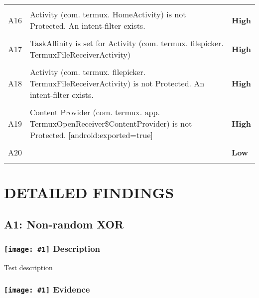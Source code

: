 \documentclass[12p]{article}
\newcommand{\icon}[1]{\texttt{[image: \#1]}}
\begin{document}
\begin{longtable}{p{0.5cm} p{10cm} p{1.5cm}}
\hline\\	A16&Activity \newline (com. termux. HomeActivity) is not Protected. An intent-filter exists.& \color{ferrarired}\textbf{High} \\
\hline\\	A17&TaskAffinity is set for Activity \newline (com. termux. filepicker. TermuxFileReceiverActivity)& \color{ferrarired}\textbf{High} \\
\hline\\	A18&Activity \newline (com. termux. filepicker. TermuxFileReceiverActivity) is not Protected. An intent-filter exists.& \color{ferrarired}\textbf{High} \\
\hline\\	A19&Content Provider \newline (com. termux. app. TermuxOpenReceiver\$ContentProvider) is not Protected. [android:exported=true]& \color{ferrarired}\textbf{High} \\
\hline\\	A20&& \color{amber}\textbf{Low} \\
\hline\\	\end{longtable}
\cleardoublepage
\section{DETAILED FINDINGS}
\subsection{A1: Non-random XOR}
\subsubsection*{\protect\icon{/home/miki/Documents/GITHUB/AndroidPermissions/python/vulns/report_icons/basic_sheet.png} Description}
Test description
\subsubsection*{\protect\icon{/home/miki/Documents/GITHUB/AndroidPermissions/python/vulns/report_icons/basic_magnifier.png} Evidence}


\end{document}
